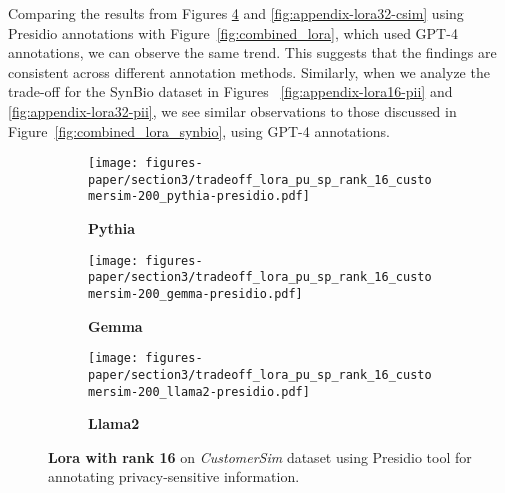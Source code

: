 Comparing the results from Figures \ref{fig:appendix-lora16-csim} and \ref{fig:appendix-lora32-csim} using Presidio annotations with Figure~\ref{fig:combined_lora}, which used GPT-4 annotations, we can observe the same trend. This suggests that the findings are consistent across different annotation methods. Similarly, when we analyze the trade-off for the SynBio dataset in Figures ~\ref{fig:appendix-lora16-pii} and \ref{fig:appendix-lora32-pii}, we see similar observations to those discussed in Figure~\ref{fig:combined_lora_synbio}, using GPT-4 annotations.


\begin{figure}[h!]
    \centering
    \begin{subfigure}{0.48\linewidth}
    \centering
    \texttt{[image: figures-paper/section3/tradeoff\_lora\_pu\_sp\_rank\_16\_customersim-200\_pythia-presidio.pdf]}
    \caption{\textbf{Pythia}}
    \label{fig:appendix-lora16_csima}
    \end{subfigure}
    \begin{subfigure}{0.48\linewidth}
    \centering
    \texttt{[image: figures-paper/section3/tradeoff\_lora\_pu\_sp\_rank\_16\_customersim-200\_gemma-presidio.pdf]}
    \caption{\textbf{Gemma}}
    \label{fig:appendix-lora16_csimb}
    \end{subfigure}
    \begin{subfigure}{0.48\linewidth}
    \centering
    \texttt{[image: figures-paper/section3/tradeoff\_lora\_pu\_sp\_rank\_16\_customersim-200\_llama2-presidio.pdf]}
    \caption{\textbf{Llama2}}
    \label{fig:appendix-lora16_csimc}
    \end{subfigure}
    \caption{\textbf{Lora with rank 16} on \emph{CustomerSim} dataset using Presidio tool for annotating privacy-sensitive information.}
    \label{fig:appendix-lora16-csim}
\end{figure}

